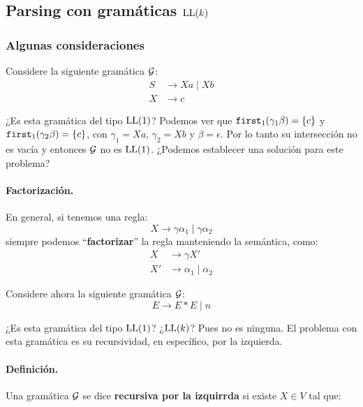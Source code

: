     \subsection[Parsing con gramáticas LL(k)]{Parsing con gramáticas $\text{LL}(k)$}
    \subsubsection{Algunas consideraciones}
    Considere la siguiente gramática $\mathcal{G}$:
    \begin{align*}
        S & \to Xa \mid Xb \\
        X & \to c
    \end{align*}

    ¿Es esta gramática del tipo $\text{LL}(1)$? Podemos ver que $\texttt{first}_1(\gamma_1 \beta) = \{c\}$ y $\texttt{first}_1(\gamma_2 \beta) = \{c\}$, con $\gamma_1 = Xa$, $\gamma_2 = Xb$ y $\beta = \epsilon$. Por lo tanto su intersección no es vacía y entonces $\mathcal{G}$ no es $\text{LL}(1)$. ¿Podemos establecer una solución para este problema?

    \paragraph{Factorización.} En general, si tenemos una regla:
    $$
        X \to \gamma\alpha_1 \mid \gamma \alpha_2
    $$
    siempre podemos ``\textbf{factorizar}'' la regla manteniendo la semántica, como:
    \begin{align*}
        X  & \to \gamma X'              \\
        X' & \to \alpha_1 \mid \alpha_2
    \end{align*}

    Considere ahora la siguiente gramática $\mathcal{G}$:
    $$
        E \to E * E \mid n
    $$

    ¿Es esta gramática del tipo $\text{LL}(1)$? ¿$\text{LL}(k)$? Pues no es ninguna. El problema con esta gramática es su recursividad, en específico, por la izquierda.

    \paragraph{Definición.} Una gramática $\mathcal{G}$ se dice \textbf{recursiva por la izquirrda} si existe $X \in V$ tal que:

